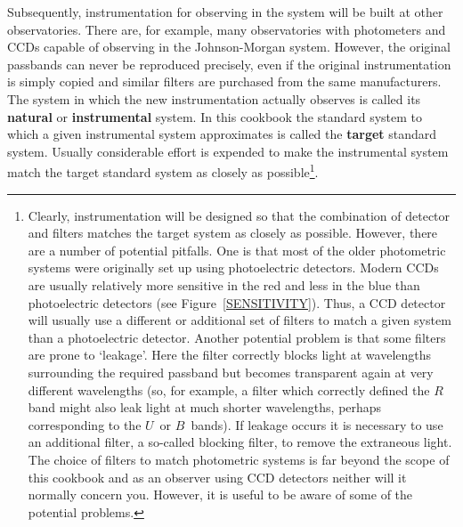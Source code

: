 \documentclass[twoside,11pt,nolof]{starlink}
\begin{document}
Subsequently, instrumentation for observing in the system will be built
at other observatories.  There are, for example, many observatories
with photometers and CCDs capable of observing in the Johnson-Morgan
system.  However, the original passbands can never be reproduced
precisely, even if the original instrumentation is simply copied and
similar filters are purchased from the same manufacturers.  The system
in which the new instrumentation actually observes is called its
\textbf{natural} or \textbf{instrumental} system.  In this cookbook the
standard system to which a given instrumental system approximates is
called the \textbf{target} standard system.  Usually considerable effort
is expended to make the instrumental system  match the target standard
system as closely as possible\footnote{Clearly, instrumentation will be
designed so that the combination of detector and filters matches the
target system as closely as possible.  However, there are a number of
potential pitfalls.  One is that most of the older photometric systems
were originally set up using photoelectric detectors.  Modern CCDs are
usually relatively more sensitive in the red and less in the blue than
photoelectric detectors (see Figure~\ref{SENSITIVITY}).  Thus, a CCD
detector will usually use a different or additional set of filters to
match a given system than a photoelectric detector.  Another potential
problem is that some filters are prone to `leakage'.  Here the filter
correctly blocks light at wavelengths surrounding the required passband
but becomes transparent again at very different wavelengths (so, for example,
a filter which correctly defined the $R$\, band might also leak light at
much shorter wavelengths, perhaps corresponding to the $U$\, or $B$\, bands).
If leakage occurs it is necessary to use an additional filter, a so-called
blocking filter, to remove the extraneous light.  The choice of filters
to match photometric systems is far beyond the scope of this cookbook and
as an observer using CCD detectors neither will it normally concern you.
However, it is useful to be aware of some of the potential problems.}.
\end{document}
